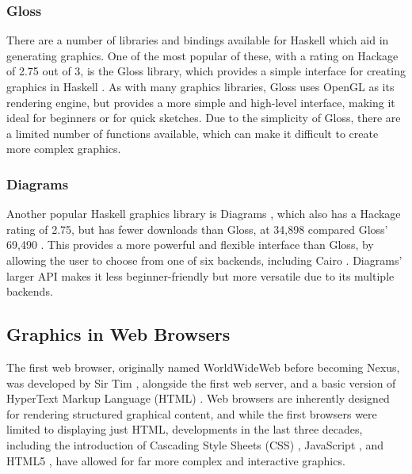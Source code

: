 \documentclass[../main.tex]{subfiles}
\begin{document}
            \subsubsection{Gloss}
                There are a number of libraries and bindings available for Haskell which aid in
                    generating graphics.
                One of the most popular of these, with a rating on Hackage of 2.75 out of 3, is
                    the Gloss library, which provides a simple interface for creating graphics in
                    Haskell \citep{hackageGloss}.
                As with many graphics libraries, Gloss uses OpenGL as its rendering engine, but
                    provides a more simple and high-level interface, making it ideal for beginners
                    or for quick sketches.
                Due to the simplicity of Gloss, there are a limited number of functions
                    available, which can make it difficult to create more complex graphics.

            \subsubsection{Diagrams}
                Another popular Haskell graphics library is Diagrams \citep{hackageDiagrams},
                    which also has a Hackage rating of 2.75, but has fewer downloads than Gloss, at
                    34,898 compared Gloss' 69,490 \citep{hackageGloss, hackageDiagrams}.
                This provides a more powerful and flexible interface than Gloss, by allowing
                    the user to choose from one of six backends, including Cairo \citep{cairo}.
                Diagrams' larger API makes it less beginner-friendly but more versatile due to
                    its multiple backends.


        \subsection{Graphics in Web Browsers}
            The first web browser, originally named WorldWideWeb before becoming Nexus, was
                developed by Sir Tim \citet{worldWideWeb}, alongside the first web server, and
                a basic version of HyperText Markup Language (HTML) \citep{html}.
            Web browsers are inherently designed for rendering structured graphical
                content, and while the first browsers were limited to displaying just HTML,
                developments in the last three decades, including the introduction of Cascading
                Style Sheets (CSS) \citep{css}, JavaScript \citep{js}, and HTML5 \citep{html5},
                have allowed for far more complex and interactive graphics.
\end{document}
